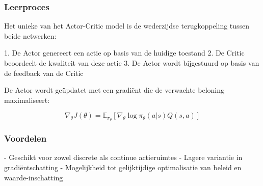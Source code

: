 \documentclass[a4paper,12pt]{report}
\begin{document}
\subsubsection{Leerproces}

Het unieke van het Actor-Critic model is de wederzijdse terugkoppeling tussen
beide netwerken:

1. De Actor genereert een actie op basis van de huidige toestand
2. De Critic beoordeelt de kwaliteit van deze actie
3. De Actor wordt bijgestuurd op basis van de feedback van de Critic

De Actor wordt geüpdatet met een gradiënt die de verwachte beloning
maximaliseert:

\begin{equation}
    \nabla_\theta J(\theta) = \mathbb{E}_{\pi_\theta}[\nabla_\theta \log \pi_\theta(a|s) Q(s,a)]
\end{equation}

\subsubsection{Voordelen}
- Geschikt voor zowel discrete als continue actieruimtes
- Lagere variantie in gradiëntschatting
- Mogelijkheid tot gelijktijdige optimalisatie van beleid en waarde-inschatting
\end{document}
